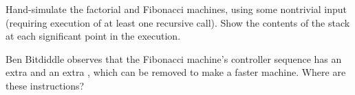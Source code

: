 \begin{exercise}
	\label{Exercise 5.5}
	Hand-simulate the factorial and Fibonacci machines, using some nontrivial input (requiring execution of at least one recursive call).
	Show the contents of the stack at each significant point in the execution.
\end{exercise}



\begin{exercise}
	\label{Exercise 5.6}
	Ben Bitdiddle observes that the Fibonacci machine’s controller sequence has an extra  and an extra , which can be removed to make a faster machine.
	Where are these instructions?
\end{exercise}
